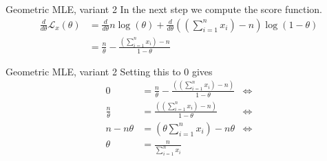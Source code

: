 \documentclass[14pt]{beamer}
\begin{document}
\begin{frame}{Geometric MLE, variant 2}
In the next step we compute the score function.
\begin{align*}
\frac{d}{d\theta}\mathcal{L}_{x}(\theta) &=
                                           \frac{d}{d\theta}n\log(\theta)
                                           + \frac{d}{d\theta}
                                            \left((\sum_{i=1}^{n}x_{i}) - n\right)\log(1-\theta) \\
&= \frac{n}{\theta} - \frac{\left(\sum_{i=1}^{n}x_{i}\right) - n}{1-\theta}
\end{align*}
\end{frame}

\begin{frame}{Geometric MLE, variant 2}
Setting this to 0 gives
\begin{align*}
0 &= \frac{n}{\theta} - \frac{((\sum_{i=1}^{n}x_{i}) - n)}{1-\theta} &\Leftrightarrow \\
\frac{n}{\theta} &= \frac{((\sum_{i=1}^{n}x_{i}) - n)}{1-\theta} &\Leftrightarrow \\
n - n\theta &= (\theta \sum_{i=1}^{n}x_{i}) - n \theta &\Leftrightarrow \\
\theta &= \frac{n}{\sum_{i=1}^{n}x_{i}}&
\end{align*}
\end{frame}
\end{document}

